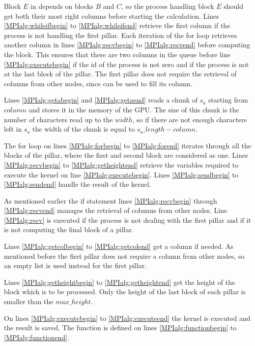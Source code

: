 Block $E$ in  depends on blocks $B$ and $C$, so the process handling block $E$ should get both their most right columns before starting the calculation.
Lines \ref{MPIalg:whileifbegin} to \ref{MPIalg:whileifend} retrieve the first column if the process is not handling the first pillar.
Each iteration of the for loop retrieves another column in lines \ref{MPIalg:recvbegin} to \ref{MPIalg:recvend} before computing the block.
This ensures that there are two columns in the queue before line \ref{MPIalg:executebegin} if the id of the process is not zero and if the process is not at the last block of the pillar.
The first pillar does not require the retrieval of columns from other nodes, since  can be used to fill its column.

Lines \ref{MPIalg:getabegin} and \ref{MPIalg:getaend} reads a chunk of $s_a$ starting from $column$ and stores it in the memory of the GPU.
The size of this chunk is the number of characters read up to the $width$, so if there are not enough characters left in $s_a$ the width of the chunk is equal to $s_a\_length - column$.

The for loop on lines \ref{MPIalg:forbegin} to \ref{MPIalg:forend} iterates through all the blocks of the pillar, where the first and second block are considered as one.
Lines \ref{MPIalg:recvbegin} to \ref{MPIalg:getheightend} retrieve the variables required to execute the kernel on line \ref{MPIalg:executebegin}.
Lines \ref{MPIalg:sendbegin} to \ref{MPIalg:sendend} handle the result of the kernel.

As mentioned earlier the if statement lines \ref{MPIalg:recvbegin} through \ref{MPIalg:recvend} manages the retrieval of columns from other nodes.
Line \ref{MPIalg:recv} is executed if the process is not dealing with the first pillar and if it is not computing the final block of a pillar.

Lines \ref{MPIalg:getcolbegin} to \ref{MPIalg:getcolend} get a column if needed.
As mentioned before the first pillar does not require a column from other nodes, so an empty list is used instead for the first pillar.

Lines \ref{MPIalg:getheightbegin} to \ref{MPIalg:getheightend} get the height of the block which is to be processed.
Only the height of the last block of each pillar is smaller than the $max\_height$.

On lines \ref{MPIalg:executebegin} to \ref{MPIalg:executeend} the kernel is executed and the result is saved.
The function is defined on lines \ref{MPIalg:functionbegin} to \ref{MPIalg:functionend}.

